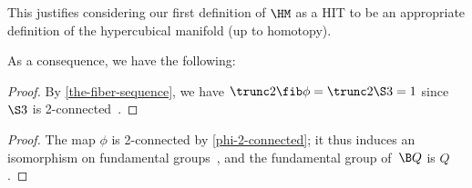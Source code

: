 \documentclass[a4paper]{article}
\begin{document}

\noindent
This justifies considering our first definition of $\HM$ as a HIT to be an appropriate definition of the hypercubical manifold (up to homotopy).

As a consequence, we have the following:

\begin{proof}
  By \cref{the-fiber-sequence}, we have $\trunc2{\fib\phi}=\trunc2{\S3}=1$ since $\S3$ is 2-connected~\cite[Corollary 8.2.2]{hottbook}.
\end{proof}


\begin{proof}
  The map $\phi$ is 2-connected by \cref{phi-2-connected}; it thus induces an isomorphism on fundamental groups~\cite[Corollary 8.8.5]{hottbook}, and the fundamental group of~$\B Q$ is $Q$.
\end{proof}

\end{document}
